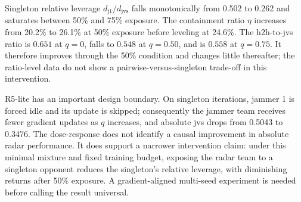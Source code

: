 Singleton relative leverage $d_{\mathrm{j1}}/d_{\mathrm{jvs}}$ falls monotonically from 0.502 to 0.262 and saturates between 50\% and 75\% exposure. The containment ratio $\eta$ increases from 20.2\% to 26.1\% at 50\% exposure before leveling at 24.6\%. The h2h-to-jvs ratio is $0.651$ at $q=0$, falls to $0.548$ at $q=0.50$, and is $0.558$ at $q=0.75$. It therefore improves through the 50\% condition and changes little thereafter; the ratio-level data do not show a pairwise-versus-singleton trade-off in this intervention.

R5-lite has an important design boundary. On singleton iterations, jammer 1 is forced idle and its update is skipped; consequently the jammer team receives fewer gradient updates as $q$ increases, and absolute jvs drops from 0.5043 to 0.3476. The dose-response does not identify a causal improvement in absolute radar performance. It does support a narrower intervention claim: under this minimal mixture and fixed training budget, exposing the radar team to a singleton opponent reduces the singleton's relative leverage, with diminishing returns after 50\% exposure. A gradient-aligned multi-seed experiment is needed before calling the result universal.
